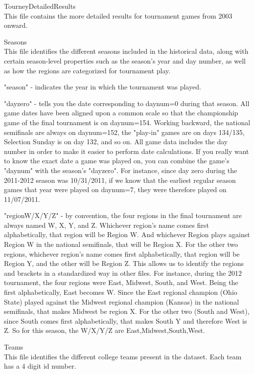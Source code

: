 \documentclass{article} %
\begin{document}
TourneyDetailedResults\\
This file contains the more detailed results for tournament games from 2003 onward.


Seasons\\
This file identifies the different seasons included in the historical data, along with certain season-level properties such as the season's year and day number, as well as how the regions are categorized for tournament play.

"season" - indicates the year in which the tournament was played.

"dayzero" - tells you the date corresponding to daynum=0 during that season. All game dates have been aligned upon a common scale so that the championship game of the final tournament is on daynum=154. Working backward, the national semifinals are always on daynum=152, the "play-in" games are on days 134/135, Selection Sunday is on day 132, and so on. All game data includes the day number in order to make it easier to perform date calculations. If you really want to know the exact date a game was played on, you can combine the game's "daynum" with the season's "dayzero". For instance, since day zero during the 2011-2012 season was 10/31/2011, if we know that the earliest regular season games that year were played on daynum=7, they were therefore played on 11/07/2011.

"regionW/X/Y/Z" - by convention, the four regions in the final tournament are always named W, X, Y, and Z. Whichever region's name comes first alphabetically, that region will be Region W. And whichever Region plays against Region W in the national semifinals, that will be Region X. For the other two regions, whichever region's name comes first alphabetically, that region will be Region Y, and the other will be Region Z. This allows us to identify the regions and brackets in a standardized way in other files. For instance, during the 2012 tournament, the four regions were East, Midwest, South, and West. Being the first alphabetically, East becomes W. Since the East regional champion (Ohio State) played against the Midwest regional champion (Kansas) in the national semifinals, that makes Midwest be region X. For the other two (South and West), since South comes first alphabetically, that makes South Y and therefore West is Z. So for this season, the W/X/Y/Z are East,Midwest,South,West.



Teams\\
This file identifies the different college teams present in the dataset. Each team has a 4 digit id number.
\end{document}
